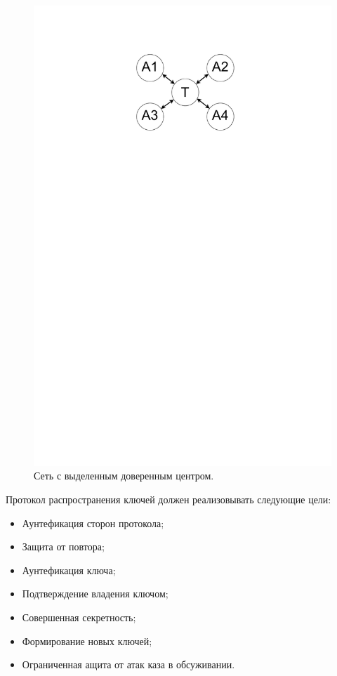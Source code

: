 \documentclass[a4paper]{article}
\begin{document}
\begin{figure}[H]
\begin{center}
\begin{minipage}[h]{0.43\linewidth}
	\includegraphics[width=1\linewidth]{pic2.pdf}
	\caption{Сеть с выделенным доверенным центром.}
	\label{p3}
	\end{minipage}
	\end{center}
\end{figure}

Протокол распространения ключей должен реализовывать следующие цели:
\begin{itemize}
    \item Аунтефикация сторон протокола;
    \item Защита от повтора;
    \item Аунтефикация ключа;
    \item Подтверждение владения ключом;
    \item Совершенная секретность;
    \item Формирование новых ключей;
    \item Ограниченная ащита от атак каза в обсуживании.
\end{itemize}
\end{document}
